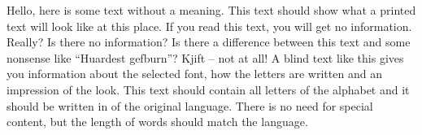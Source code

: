 \documentclass[a4paper, 12pt]{book}
\begin{document}
  
  Hello, here is some text without a meaning. This text should show what a printed text will look like at this place. If you read this text, you will get no information. Really? Is there no information? Is there a difference between this text and some nonsense like “Huardest gefburn”? Kjift – not at all! A blind text like this gives you information about the selected font, how the letters are written and an impression of the look. This text should contain all letters of the alphabet and it should be written in of the original language. There is no need for special content, but the length of words should match the language.
  
\end{document}
